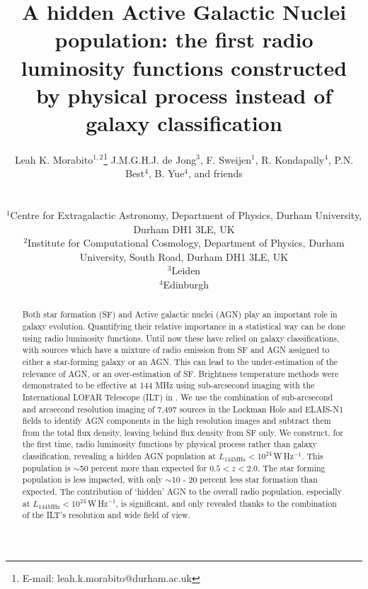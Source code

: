\documentclass[usenatbib,fleqn,letters]{mnras}
\title[A hidden AGN population]{A hidden Active Galactic Nuclei population: the first radio luminosity functions constructed by physical process instead of galaxy classification}
\author[L.K. Morabito]{\parbox{\textwidth}{Leah K. Morabito$^{1,2}$\thanks{E-mail: leah.k.morabito@durham.ac.uk}\orcidlink{0000-0003-0487-6651}
J.M.G.H.J. de Jong$^{3}$,
F. Sweijen$^{1}$,
R. Kondapally$^{4}$,
P.N. Best$^{4}$,
B. Yue$^{4}$, and friends
\\}\\ 
$^{1}$Centre for Extragalactic Astronomy, Department of Physics, Durham University, Durham DH1 3LE, UK \\
$^{2}$Institute for Computational Cosmology, Department of Physics, Durham University, South Road, Durham DH1 3LE, UK \\ 
$^{3}$Leiden \\
$^{4}$Edinburgh \\}
\newcommand{\wphz}{$\,$W$\,$Hz$^{-1}$}
\newcommand{\llof}{$L_{\textrm{144MHz}}$}
\begin{document}
\date{}
\pagerange{\pageref{firstpage}--\pageref{lastpage}} 
\maketitle

\label{firstpage}


\begin{abstract}
Both star formation (SF) and Active galactic nuclei (AGN) play an important role in galaxy evolution. Quantifying their relative importance in a statistical way can be done using radio luminosity functions. Until now these have relied on galaxy classifications, with sources which have a mixture of radio emission from SF and AGN assigned to either a star-forming galaxy or an AGN. This can lead to the under-estimation of the relevance of AGN, or an over-estimation of SF. Brightness temperature methods were demonstrated to be effective at 144 MHz using sub-arcsecond imaging with the International LOFAR Telescope (ILT) in \cite{morabito_identifying_2022}. We use the combination of sub-arcsecond and arcsecond resolution imaging of 7,497 sources in the Lockman Hole and ELAIS-N1 fields to identify AGN components in the high resolution images and subtract them from the total flux density, leaving behind flux density from SF only. We construct, for the first time, radio luminosity functions by physical process rather than galaxy classification, revealing a hidden AGN population at \llof $<10^{24}$\wphz . This population is $\sim$50 percent more than expected for $0.5<z<2.0$. The star forming population is less impacted, with only $\sim$10 - 20 percent less star formation than expected. The contribution of `hidden' AGN to the overall radio population, especially at \llof $<10^{24}$\wphz , is significant, and only revealed thanks to the combination of the ILT's resolution and wide field of view. \vspace{3.7in}
\end{abstract}




\end{document}
